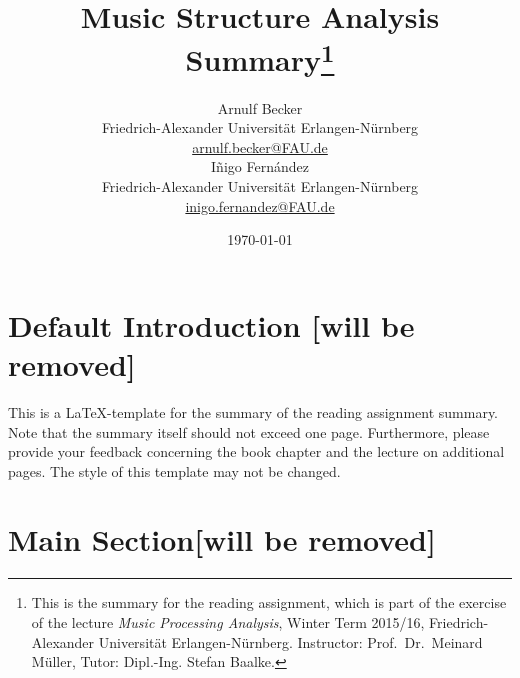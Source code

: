 \documentclass[a4paper, 9pt, twocolumn]{extarticle}
\begin{document}
\date{\normalsize \today}

\title{\vspace{-8mm}\textbf{\Large
Music Structure Analysis Summary\footnote{This is the summary for the reading assignment,
which is part of the exercise of the lecture \emph{Music Processing Analysis}, Winter Term 2015/16,
Friedrich-Alexander Universit\"at Erlangen-N\"urnberg.
Instructor: Prof.\ Dr.\ Meinard M\"uller,
Tutor: Dipl.-Ing. Stefan Baalke.
}}}

\author{
{
\begin{minipage}[t]{.45\textwidth}
\center
Arnulf Becker\\
\small
Friedrich-Alexander Universit\"at Erlangen-N\"urnberg
\protect\\{} %
\url{arnulf.becker@FAU.de}
\end{minipage}%
\begin{minipage}[t]{.45\textwidth}
\center
Iñigo Fern\' andez\\%
\small
Friedrich-Alexander Universit\"at Erlangen-N\"urnberg
\protect\\{} %
\url{inigo.fernandez@FAU.de}
\end{minipage}%
}
}
 
\maketitle
\thispagestyle{empty}

\section{Default Introduction [will be removed]}
\label{section:defaultIntroduction}

This is a \LaTeX-template for the summary of the reading assignment summary. Note that the summary
itself should not exceed one page. Furthermore, please provide your feedback concerning the 
book chapter and the lecture on additional pages.
The style of this template may not be changed.



\section{Main Section[will be removed]}
\label{section:main}
\end{document}
